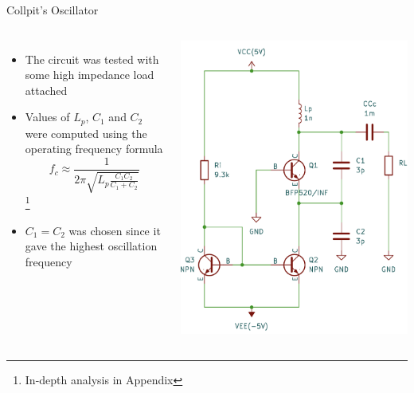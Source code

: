 \documentclass{beamer}
\begin{document}
\begin{frame}{Collpit's Oscillator}
\small
\begin{columns}
  \begin{itemize}
    \item <1-> The circuit was tested with some high impedance load attached
    \item <2-> Values of \(L_p\), \(C_1\) and \(C_2\) were computed using the operating frequency formula \[f_c\approx\frac{1}{2\pi\sqrt{L_p\frac{C_1C_2}{C_1+C_2}}}\] \footnote{In-depth analysis in Appendix}
    \item <3-> \(C_1=C_2\) was chosen since it gave the highest oscillation frequency
  \end{itemize}
  \includegraphics[width=0.95\linewidth]{images/collpits.png}
\end{columns}

\end{frame}


\end{document}
